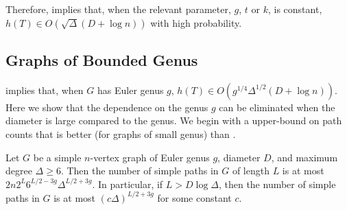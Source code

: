 \documentclass{patmorin}
\begin{document}
Therefore,  implies that,
when the relevant parameter, $g$, $t$ or $k$, is constant, $h(T)\in
O(\sqrt{\Delta}(D+\log n))$ with high probability.  

\subsection{Graphs of Bounded Genus}

 implies that, when $G$ has Euler genus
$g$, $h(T)\in O(g^{1/4}\Delta^{1/2}(D+\log n))$.  Here we show that the
dependence on the genus $g$ can be eliminated when the diameter is large
compared to the genus.  We begin with a upper-bound on path counts that
is better (for graphs of small genus) than .

\begin{lem}
   Let $G$ be a simple $n$-vertex graph of Euler genus $g$, diameter
   $D$, and maximum degree $\Delta\ge 6$. Then the number of simple paths
   in $G$ of length $L$ is at most $2n2^{L}6^{L/2-3g}\Delta^{L/2+3g}$.
   In particular, if $L>D\log\Delta$, then the number of simple paths
   in $G$ is at most $(c\Delta)^{L/2+3g}$ for some constant $c$.
\end{lem}
\end{document}
